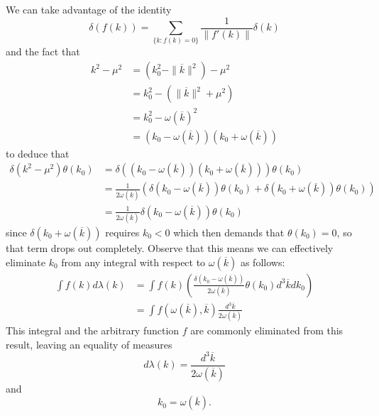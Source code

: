 We can take advantage of the identity
\begin{equation}%
\delta(f(k)) = \sum_{\{k:f(k)=0\}}\frac{1}{\|f'(k)\|}\delta(k)
\end{equation}
and  the fact that
\begin{subequations}
\begin{align}
k^{2}-\mu^{2} &= (k_{0}^{2}-\|\overline{k}\|^{2})-\mu^{2}\\
&= k_{0}^{2} - (\|\overline{k}\|^{2} + \mu^{2}) \\
&= k_{0}^{2} - \omega(\overline{k})^{2} \\
&= (k_{0} - \omega(\overline{k}))(k_{0} + \omega(\overline{k}))
\end{align}
\end{subequations}
to deduce that
\begin{subequations}
\begin{align}
\delta(k^{2}-\mu^{2})\theta(k_{0}) &= \delta\left((k_{0} - \omega(\overline{k}))(k_{0} + \omega(\overline{k}))\right)\theta(k_0)\\
&=\frac{1}{2\omega(\overline{k})}(\delta(k_0-\omega(\overline{k}))\theta(k_0)+\delta(k_0+\omega(\overline{k}))\theta(k_0))\\
&=\frac{1}{2\omega(\overline{k})}\delta(k_0-\omega(\overline{k}))\theta(k_0)
\end{align}
\end{subequations}
since $\delta(k_0+\omega(\overline{k}))$ requires $k_0<0$ which
then demands that $\theta(k_0)=0$, so that term drops out completely.
Observe that this means we can effectively eliminate $k_0$ from
any integral with respect to $\omega(\overline{k})$ as follows:
\begin{subequations}
\begin{align}
\int f(k)d\lambda(k) &= \int f(k)\left(\frac{\delta(k_{0}-\omega(\overline{k}))}{2\omega(\overline{k})}\theta(k_{0})d^{3}\overline{k}dk_{0}\right)\\
&= \int f\left(\omega(\overline{k}),\overline{k}\right)\frac{d^{3}\overline{k}}{2\omega(\overline{k})}
\end{align}
\end{subequations}
This integral and the arbitrary function $f$ are commonly
eliminated from this result, leaving an equality of measures
\begin{equation}%
d\lambda(k) = \frac{d^{3}\overline{k}}{2\omega(\overline{k})}
\end{equation}
and
\begin{equation}%
k_{0} = \omega(\overline{k}).
\end{equation}

